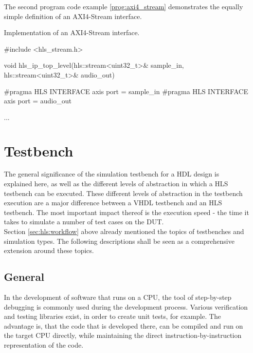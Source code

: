 The second program code example \ref{prog:axi4_stream} demonstrates the equally simple definition of an AXI4-Stream interface.

\begin{program}
  \caption{Implementation of an AXI4-Stream interface.}
  \label{prog:axi4_stream}
\begin{CppCode}
 #include <hls_stream.h>

 void hls_ip_top_level(hls::stream<uint32_t>& sample_in,
                       hls::stream<uint32_t>& audio_out) {
     #pragma HLS INTERFACE axis port = sample_in
     #pragma HLS INTERFACE axis port = audio_out

     ...
 }
\end{CppCode}
\end{program}

\section{Testbench}

The general significance of the simulation testbench for a HDL design is explained here, as well as the different levels of abstraction in which a HLS testbench can be executed.
These different levels of abstraction in the testbench execution are a major difference between a VHDL testbench and an HLS testbench.
The most important impact thereof is the execution speed - the time it takes to simulate a number of test cases on the DUT.\\

Section \ref{sec:hls:workflow} above already mentioned the topics of testbenches and simulation types.
The following descriptions shall be seen as a comprehensive extension around these topics.

\subsection{General}
\label{sub:hls:testbench:general}

In the development of software that runs on a CPU, the tool of step-by-step debugging is commonly used during the development process.
Various verification and testing libraries exist, in order to create unit tests, for example.
The advantage is, that the code that is developed there, can be compiled and run on the target CPU directly, while maintaining the direct instruction-by-instruction representation of the code.\\


